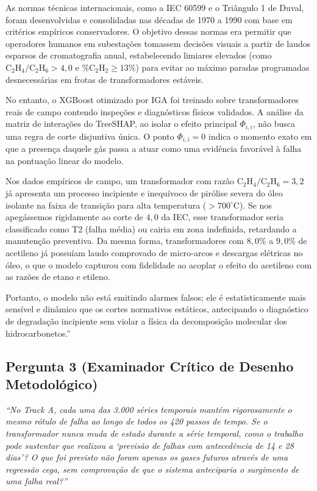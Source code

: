\documentclass[11pt,a4paper]{article}
\begin{document}
As normas técnicas internacionais, como a IEC 60599 e o Triângulo 1 de Duval, foram desenvolvidas e consolidadas nas décadas de 1970 a 1990 com base em critérios empíricos conservadores. O objetivo dessas normas era permitir que operadores humanos em subestações tomassem decisões visuais a partir de laudos esparsos de cromatografia anual, estabelecendo limiares elevados (como $\text{C}_2\text{H}_4/\text{C}_2\text{H}_6 > 4{,}0$ e $\% \text{C}_2\text{H}_2 \ge 13\%$) para evitar ao máximo paradas programadas desnecessárias em frotas de transformadores estáveis.

No entanto, o XGBoost otimizado por IGA foi treinado sobre transformadores reais de campo contendo inspeções e diagnósticos físicos validados. A análise da matriz de interações do TreeSHAP, ao isolar o efeito principal $\Phi_{i, i}$, não busca uma regra de corte disjuntiva única. O ponto $\Phi_{i, i} = 0$ indica o momento exato em que a presença daquele gás passa a atuar como uma evidência favorável à falha na pontuação linear do modelo. 

Nos dados empíricos de campo, um transformador com razão $\text{C}_2\text{H}_4/\text{C}_2\text{H}_6 = 3{,}2$ já apresenta um processo incipiente e inequívoco de pirólise severa do óleo isolante na faixa de transição para alta temperatura ($> 700^\circ\text{C}$). Se nos apegássemos rigidamente ao corte de $4{,}0$ da IEC, esse transformador seria classificado como T2 (falha média) ou cairia em zona indefinida, retardando a manutenção preventiva. Da mesma forma, transformadores com $8{,}0\%$ a $9{,}0\%$ de acetileno já possuíam laudo comprovado de micro-arcos e descargas elétricas no óleo, o que o modelo capturou com fidelidade ao acoplar o efeito do acetileno com as razões de etano e etileno. 

Portanto, o modelo não está emitindo alarmes falsos; ele é estatisticamente mais sensível e dinâmico que os cortes normativos estáticos, antecipando o diagnóstico de degradação incipiente sem violar a física da decomposição molecular dos hidrocarbonetos.''\vspace{0.3cm}

\subsection{Pergunta 3 (Examinador Crítico de Desenho Metodológico)}
\textit{``No Track A, cada uma das 3.000 séries temporais mantém rigorosamente o mesmo rótulo de falha ao longo de todos os 420 passos de tempo. Se o transformador nunca muda de estado durante a série temporal, como o trabalho pode sustentar que realizou a `previsão de falhas com antecedência de 14 e 28 dias'? O que foi previsto não foram apenas os gases futuros através de uma regressão cega, sem comprovação de que o sistema anteciparia o surgimento de uma falha real?''}
\end{document}
